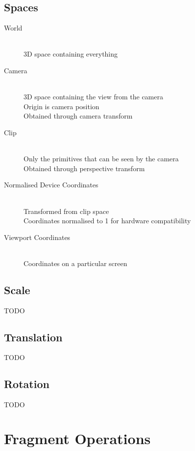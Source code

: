\documentclass[a4paper]{article}
\begin{document}
\subsection{Spaces}

\begin{description}
  \item[World] \hfill \\
    3D space containing everything

  \item[Camera] \hfill \\
    3D space containing the view from the camera \\
    Origin is camera position \\
    Obtained through camera transform

  \item[Clip] \hfill \\
    Only the primitives that can be seen by the camera \\
    Obtained through perspective transform

  \item[Normalised Device Coordinates] \hfill \\
    Transformed from clip space \\
    Coordinates normalised to 1 for hardware compatibility

  \item[Viewport Coordinates] \hfill \\
    Coordinates on a particular screen

\end{description}

\subsection{Scale}

TODO

\subsection{Translation}

TODO

\subsection{Rotation}

TODO

\section{Fragment Operations}
\label{sec:fragment_operations}
\end{document}
